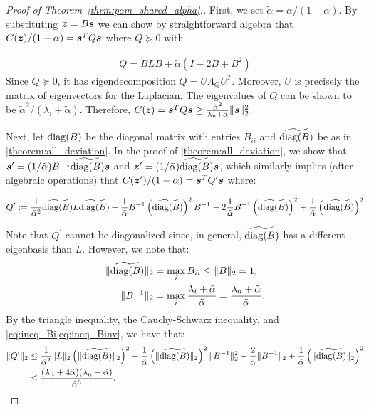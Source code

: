 \begin{proof}[Proof of Theorem~\ref{thrm:pom_shared_alpha}.]
First, we set $\tilde \alpha = \alpha / (1 - \alpha)$. By substituting $\bm{z} = B \bm{s}$ we can show by straightforward algebra that $C(\bm{z}) / (1 - \alpha) = \bm{s}^T Q \bm{s}$ where $Q \succeq 0$ with 

\begin{align}
    Q = B L B + \tilde \alpha (I - 2B + B^2)
\end{align}
Since $Q \succeq 0$, it has eigendecomposition $Q = U \Lambda_Q U^T$. Moreover, $U$ is precisely the matrix of eigenvectors for the Laplacian. The eigenvalues of $Q$ can be shown to be $\tilde \alpha^2 / (\lambda_i + \tilde \alpha)$. Therefore, $C(z) = \bm{s}^T Q \bm{s} \ge \frac {\tilde \alpha^2} {\lambda_n + \tilde \alpha} \| \bm{s} \|_2^2$. 

Next, let $\textrm{diag} (B)$ be the diagonal matrix with entries $B_{ii}$ and $\widetilde {\textrm{diag} (B)}$ be as in \cref{theorem:all_deviation}. In the proof of \cref{theorem:all_deviation}, we show that $\bm{s}^\prime = (1/\tilde \alpha) B^{-1} \widetilde {\textrm{diag} (B)} \bm{s}$ and $\bm{z}^\prime = (1 /\tilde \alpha) \widetilde{\textrm{diag} (B)} \bm{s}$, which similarly implies (after algebraic operations) that $C(\bm{z}^\prime) / (1 - \alpha) = \bm{s}^T Q^\prime \bm{s}$ where: 

\begin{align*}
    Q^\prime := \frac {1} {\tilde \alpha^2} \widetilde{\textrm{diag} (B)} L \widetilde {\textrm{diag} (B)} + \frac {1} {\tilde \alpha} B^{-1} \left ( \widetilde{\textrm{diag} (B)} \right )^2 B^{-1} - 2 \frac {1} {\tilde \alpha} B^{-1} \left ( \widetilde{\textrm{diag} (B)} \right )^2 + \frac {1} {\tilde \alpha} \left ( \widetilde{\textrm{diag} (B)} \right )^2
\end{align*}

Note that $Q^\prime$ cannot be diagonalized since, in general, $\widetilde{\textrm{diag} (B)}$ has a different eigenbasis than $L$. However, we note that: 
\begin{align} \label{eq:ineq_Bi}
    \| \widetilde {\textrm{diag} (B)} \|_2 & = \max_i B_{ii} \le \| B \|_2 = 1, \\
    \| B^{-1} \|_2 & = \max_i \frac {\lambda_i + \tilde \alpha} {\tilde \alpha} = \frac {\lambda_n + \tilde \alpha} {\tilde \alpha}. \label{eq:ineq_Binv}
\end{align}
By the triangle inequality, the Cauchy-Schwarz inequality, and \cref{eq:ineq_Bi,eq:ineq_Binv}, we have that: 
\begin{align*}
    \| Q^\prime \|_2 & \le \frac {1} {\tilde \alpha^2} \| L \|_2 \left ( \| \widetilde {\textrm{diag} (B)} \|_2 \right )^2 + \frac {1} {\tilde \alpha} \left ( \| \widetilde {\textrm{diag} (B)} \|_2 \right )^2 \| B^{-1} \|_2^2 + \frac 2 {\tilde \alpha} \| B^{-1} \|_2 + \frac {1} {\tilde \alpha} \left ( \| \widetilde {\textrm{diag} (B)} \|_2 \right )^2 \\
    & \le \frac {(\lambda_n + 4 \tilde \alpha) (\lambda_n + \tilde \alpha)} {\tilde \alpha^3}.
\end{align*}


\end{proof}

